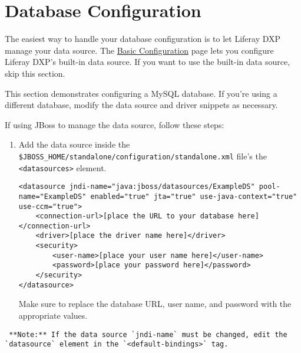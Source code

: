 \section{Database Configuration}\label{database-configuration-2}

The easiest way to handle your database configuration is to let Liferay
DXP manage your data source. The
\href{/docs/7-2/deploy/-/knowledge_base/d/preparing-for-install\#using-the-built-in-data-source}{Basic
Configuration} page lets you configure Liferay DXP's built-in data
source. If you want to use the built-in data source, skip this section.

This section demonstrates configuring a MySQL database. If you're using
a different database, modify the data source and driver snippets as
necessary.

If using JBoss to manage the data source, follow these steps:

\begin{enumerate}
\def\labelenumi{\arabic{enumi}.}
\item
  Add the data source inside the
  \texttt{\$JBOSS\_HOME/standalone/configuration/standalone.xml} file's
  the \texttt{\textless{}datasources\textgreater{}} element.

\begin{verbatim}
<datasource jndi-name="java:jboss/datasources/ExampleDS" pool-name="ExampleDS" enabled="true" jta="true" use-java-context="true" use-ccm="true">
    <connection-url>[place the URL to your database here]</connection-url>
    <driver>[place the driver name here]</driver>
    <security>
        <user-name>[place your user name here]</user-name>
        <password>[place your password here]</password>
    </security>
</datasource>
\end{verbatim}

  Make sure to replace the database URL, user name, and password with
  the appropriate values.
\end{enumerate}

\noindent\hrulefill

\begin{verbatim}
 **Note:** If the data source `jndi-name` must be changed, edit the `datasource` element in the `<default-bindings>` tag.
\end{verbatim}

\noindent\hrulefill

